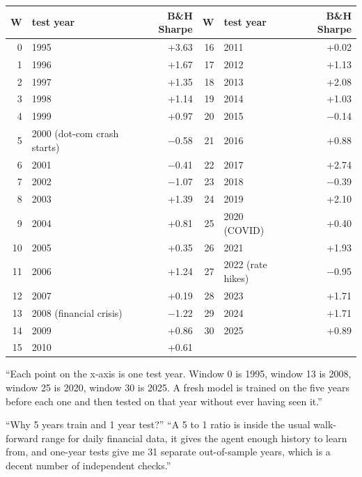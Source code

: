 \documentclass[11pt,a4paper]{article}
\begin{document}
\begin{center}\small
\begin{tabular}{rlr@{\qquad}rlr}
\toprule
W & test year & B\&H Sharpe & W & test year & B\&H Sharpe \\
\midrule
0 & 1995 & +3.63 & 16 & 2011 & +0.02 \\
1 & 1996 & +1.67 & 17 & 2012 & +1.13 \\
2 & 1997 & +1.35 & 18 & 2013 & +2.08 \\
3 & 1998 & +1.14 & 19 & 2014 & +1.03 \\
4 & 1999 & +0.97 & 20 & 2015 & $-$0.14 \\
5 & 2000 (dot-com crash starts) & $-$0.58 & 21 & 2016 & +0.88 \\
6 & 2001 & $-$0.41 & 22 & 2017 & +2.74 \\
7 & 2002 & $-$1.07 & 23 & 2018 & $-$0.39 \\
8 & 2003 & +1.39 & 24 & 2019 & +2.10 \\
9 & 2004 & +0.81 & 25 & 2020 (COVID) & +0.40 \\
10 & 2005 & +0.35 & 26 & 2021 & +1.93 \\
11 & 2006 & +1.24 & 27 & 2022 (rate hikes) & $-$0.95 \\
12 & 2007 & +0.19 & 28 & 2023 & +1.71 \\
13 & 2008 (financial crisis) & $-$1.22 & 29 & 2024 & +1.71 \\
14 & 2009 & +0.86 & 30 & 2025 & +0.89 \\
15 & 2010 & +0.61 & & & \\
\bottomrule
\end{tabular}
\end{center}

\begin{sayit}
``Each point on the x-axis is one test year. Window 0 is 1995, window 13 is 2008, window 25
is 2020, window 30 is 2025. A fresh model is trained on the five years before each one and
then tested on that year without ever having seen it.''
\end{sayit}

\begin{qa}{``Why 5 years train and 1 year test?''}
``A 5 to 1 ratio is inside the usual walk-forward range for daily financial data, it gives
the agent enough history to learn from, and one-year tests give me 31 separate
out-of-sample years, which is a decent number of independent checks.''
\end{qa}

\end{document}
